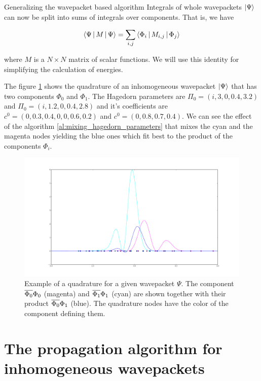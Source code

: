 \begin{chapter}{Generalizing the wavepacket based algorithm}
Integrals of whole wavepackets $\Ket{\Psi}$ can now be split into sums of integrals
over components. That is, we have

\begin{equation}
  \Braket{\Psi | M | \Psi} = \sum_{i,j} \Braket{\Phi_i | M_{i,j} | \Phi_j}
\end{equation}

where $M$ is a $N \times N$ matrix of scalar functions. We will use this identity
for simplifying the calculation of energies.

The figure \ref{fig:quadrature_nodes_mixing} shows the quadrature of an inhomogeneous
wavepacket $\Ket{\Psi}$ that has two components $\Phi_0$ and $\Phi_1$. The Hagedorn
parameters are $\Pi_0 = \left(i,3,0,0.4,3.2\right)$ and $\Pi_0 = \left(i,1.2,0,0.4,2.8\right)$ and
it's coefficients are $c^0 = \left(0,0.3,0.4,0,0,0.6,0.2\right)$ and $c^0 = \left(0,0.8,0.7,0.4\right)$.
We can see the effect of the algorithm \ref{al:mixing_hagedorn_parameters} that
mixes the cyan and the magenta nodes yielding the blue ones which fit best to the
product of the components $\Phi_i$.

\begin{figure}
  \centering
  \includegraphics[width=\linewidth]{./figures/quadrature_nodes_mixing.pdf}
  \caption{Example of a quadrature for a given wavepacket $\Psi$. The component
  $\overline{\Phi_0} \Phi_0$ (magenta) and $\overline{\Phi_1} \Phi_1$ (cyan) are shown
  together with their product $\overline{\Phi_0} \Phi_1$ (blue). The quadrature nodes
  have the color of the component defining them.}
  \label{fig:quadrature_nodes_mixing}
\end{figure}


\section{The propagation algorithm for inhomogeneous wavepackets}


\end{chapter}
